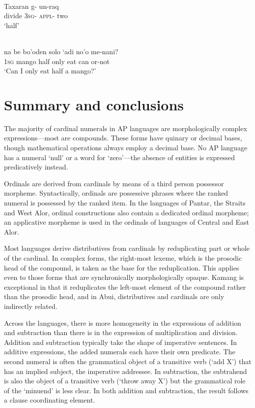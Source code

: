 \documentclass[output=paper]{LSP/langsci}
\begin{document}
               

              




\ea%
\label{bkm:Ref342746963}
\\
\gll   Taxaran  g-  un-raq   \\  
   divide  \textsc{3sg-}  \textsc{appl-} two      \\
\glt `half' 
\z

               

               
\ea
\label{ex:8:1250}
\\
\gll na  be  bo'oden  solo  `adi  no'o  me-nani? \\
  1\textsc{sg } mango  half  only  eat  can  or-not\\
\glt `Can I only eat half a mango?'
\z
 
 

 

\section{Summary and conclusions}
\label{sec:8:Summary}
The majority of cardinal numerals in AP languages are morphologically complex expressions---most are compounds. These forms have quinary or decimal bases, though mathematical operations always employ a decimal base. No AP language has a numeral `null' or a word for `zero'---the absence of entities is expressed predicatively instead.

Ordinals are derived from cardinals by means of a third person possessor morpheme. Syntactically, ordinals are possessive phrases where the ranked numeral is possessed by the ranked item. In the languages of Pantar, the Straits and West Alor, ordinal constructions also contain a dedicated ordinal morpheme; an applicative morpheme is used in the ordinals of languages of Central and East Alor. 

Most languages derive distributives from cardinals by reduplicating part or whole of the cardinal. In complex forms, the right-most lexeme, which is the prosodic head of the compound, is taken as the base for the reduplication. This applies even to those forms that are synchronically morphologically opaque. Kamang is exceptional in that it reduplicates the left-most element of the compound rather than the prosodic head, and in Abui, distributives and cardinals are only indirectly related. 

Across the languages, there is more homogeneity in the expressions of addition and subtraction than there is in the expression of multiplication and division. Addition and subtraction typically take the shape of imperative sentences. In additive expressions, the added numerals each have their own predicate. The second numeral is often the grammatical object of a transitive verb (`add X') that has an implied subject, the imperative addressee. In subtraction, the subtrahend is also the object of a transitive verb (`throw away X') but the grammatical role of the `minuend' is less clear. In both addition and subtraction, the result follows a clause coordinating element.
\end{document}
